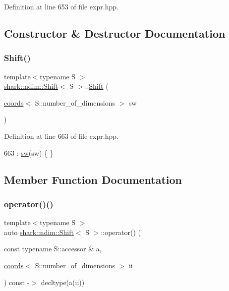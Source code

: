 Definition at line 653 of file expr.\+hpp.



\subsection{Constructor \& Destructor Documentation}
\hypertarget{classshark_1_1ndim_1_1_shift_adb6138a4655f902116238e4e08e47e68}{}\label{classshark_1_1ndim_1_1_shift_adb6138a4655f902116238e4e08e47e68} 
\subsubsection{\texorpdfstring{Shift()}{Shift()}}
{\footnotesize\ttfamily template$<$typename S $>$ \\
\hyperlink{classshark_1_1ndim_1_1_shift}{shark\+::ndim\+::\+Shift}$<$ S $>$\+::\hyperlink{classshark_1_1ndim_1_1_shift}{Shift} (\begin{DoxyParamCaption}\item[{\hyperlink{structshark_1_1ndim_1_1coords}{coords}$<$ S\+::number\+\_\+of\+\_\+dimensions $>$}]{sw }\end{DoxyParamCaption})}



Definition at line 663 of file expr.\+hpp.


\begin{DoxyCode}
663 : \hyperlink{classshark_1_1ndim_1_1_shift_a3bd6f579c282ca70d391bd43bc582331}{sw}(sw) \{ \}
\end{DoxyCode}


\subsection{Member Function Documentation}
\hypertarget{classshark_1_1ndim_1_1_shift_ac2095531d2a9060eae224166379e4e39}{}\label{classshark_1_1ndim_1_1_shift_ac2095531d2a9060eae224166379e4e39} 
\subsubsection{\texorpdfstring{operator()()}{operator()()}}
{\footnotesize\ttfamily template$<$typename S $>$ \\
auto \hyperlink{classshark_1_1ndim_1_1_shift}{shark\+::ndim\+::\+Shift}$<$ S $>$\+::operator() (\begin{DoxyParamCaption}\item[{const typename S\+::accessor \&}]{a,  }\item[{\hyperlink{structshark_1_1ndim_1_1coords}{coords}$<$ S\+::number\+\_\+of\+\_\+dimensions $>$}]{ii }\end{DoxyParamCaption}) const -\/$>$ decltype(a(ii)) \hspace{0.3cm}{\ttfamily [inline]}}



